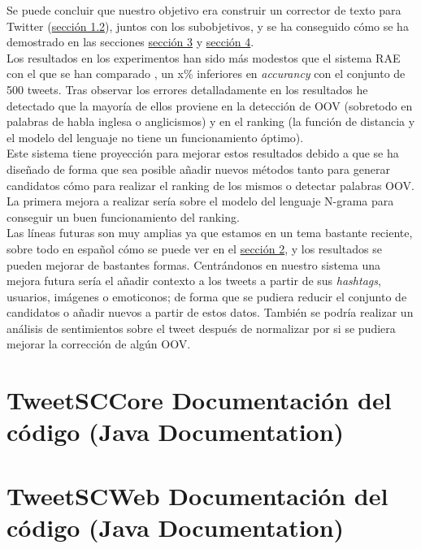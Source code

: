 \documentclass[spanish,12pt, a4paper,twoside]{paper}
\let\oldsection\section
\def\section{\cleardoublepage\oldsection}
\begin{document}
Se puede concluir que nuestro objetivo era construir un corrector de texto para Twitter (\hyperref[sec:objetivos]{sección 1.2}), juntos con los subobjetivos, y se ha conseguido cómo se ha demostrado en las secciones \hyperref[sec:solucionpropuesta]{sección 3} y \hyperref[sec:implementacion]{sección 4}.\\

Los resultados en los experimentos han sido más modestos que el sistema RAE con el que se han comparado \cite{porta:2013}, un x\% inferiores en \textit{accurancy} con el conjunto de 500 tweets. Tras observar los errores detalladamente en los resultados he detectado que la mayoría de ellos proviene en la detección de OOV (sobretodo en palabras de habla inglesa o anglicismos) y en el ranking (la función de distancia y el modelo del lenguaje no tiene un funcionamiento óptimo).\\

Este sistema tiene proyección para mejorar estos resultados debido a que se ha diseñado de forma que sea posible añadir nuevos métodos tanto para generar candidatos cómo para realizar el ranking de los mismos o detectar palabras OOV. La primera mejora a realizar sería sobre el modelo del lenguaje N-grama para conseguir un buen funcionamiento del ranking.\\

Las líneas futuras son muy amplias ya que estamos en un tema bastante reciente, sobre todo en español cómo se puede ver en el \hyperref[sec:estadodelarte]{sección 2}, y los resultados se pueden mejorar de bastantes formas. Centrándonos en nuestro sistema una mejora futura sería el añadir contexto a los tweets a partir de sus \textit{hashtags}, usuarios, imágenes o emoticonos; de forma que se pudiera reducir el conjunto de candidatos o añadir nuevos a partir de estos datos. También se podría realizar un análisis de sentimientos sobre el tweet después de normalizar por si se pudiera mejorar la corrección de algún OOV.

\section{TweetSCCore Documentación del código (Java Documentation)}\label{sec:tweetsccorejavadoc}


\section{TweetSCWeb Documentación del código (Java Documentation)}\label{sec:tweetscwebjavadoc}

\end{document}
